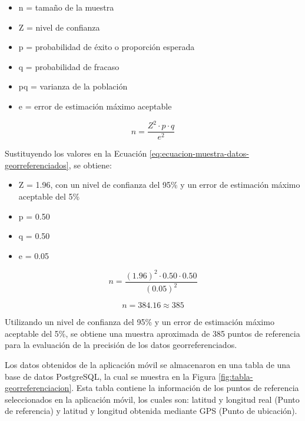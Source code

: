 \begin{itemize}
    \item n = tamaño de la muestra
    \item Z = nivel de confianza
    \item p = probabilidad de éxito o proporción esperada
    \item q = probabilidad de fracaso
    \item pq = varianza de la población
    \item e = error de estimación máximo aceptable
\end{itemize}

\begin{equation}
    n=\frac{Z^2 \cdot p \cdot q}{e^2}
    \label{eq:ecuacion-muestra-datos-georreferenciados}
\end{equation}

Sustituyendo los valores en la Ecuación \ref{eq:ecuacion-muestra-datos-georreferenciados}, se obtiene:

\begin{itemize}
    \item Z = 1.96, con un nivel de confianza del 95\% y un error de estimación máximo aceptable del 5\%
    \item p = 0.50
    \item q = 0.50
    \item e = 0.05
\end{itemize}

\begin{equation}
    n=\frac{(1.96)^2 \cdot 0.50 \cdot 0.50}{(0.05)^2}
    \label{eq:ecuacion-valores-muestra-datos-georreferenciados}
\end{equation}

\begin{equation}
    n=384.16 \approx 385
    \label{eq:ecuacion-resultado-muestra-datos-georreferenciados}
\end{equation}

Utilizando un nivel de confianza del 95\% y un error de estimación máximo aceptable del 5\%, se obtiene una muestra aproximada
de 385 puntos de referencia para la evaluación de la precisión de los datos georreferenciados.
\bigbreak

Los datos obtenidos de la aplicación móvil se almacenaron en una tabla de una base de datos PostgreSQL, la cual se muestra en
la Figura \ref{fig:tabla-georreferenciacion}. Esta tabla contiene la información de los puntos de referencia seleccionados en
la aplicación móvil, los cuales son: latitud y longitud real (Punto de referencia) y latitud y longitud obtenida mediante
GPS (Punto de ubicación).

